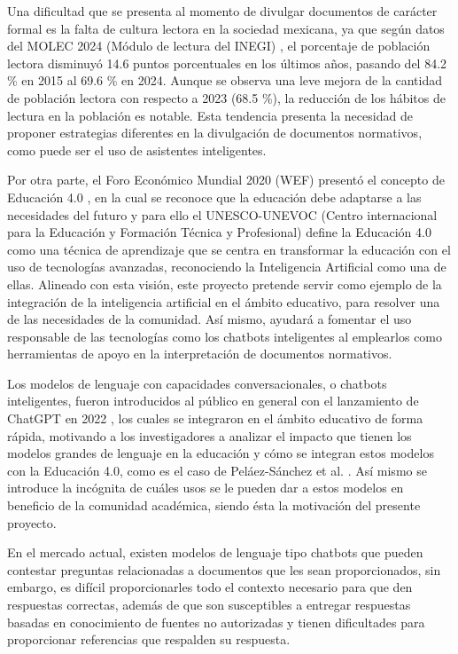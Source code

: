 Una dificultad que se presenta al momento de divulgar documentos de carácter
formal es la falta de cultura lectora en la sociedad mexicana, ya que según
datos del MOLEC 2024 (Módulo de lectura del INEGI) \cite{inegi_modulo_2024},
el porcentaje de población lectora disminuyó 14.6 puntos porcentuales en los últimos
años, pasando del 84.2 \% en 2015 al 69.6 \% en 2024. Aunque se observa
una leve mejora de la cantidad de población lectora con respecto a 2023 (68.5 \%),
la reducción de los hábitos de lectura en la población es notable. Esta tendencia
presenta la necesidad de proponer estrategias diferentes en la divulgación de documentos
normativos, como puede ser el uso de asistentes inteligentes.

Por otra parte, el Foro Económico Mundial 2020 (WEF) presentó el concepto de
Educación 4.0 \cite{world_economic_forum_schools_2020}, en la cual se reconoce que la
educación debe adaptarse a las necesidades del futuro y para ello el UNESCO-UNEVOC
(Centro internacional para la Educación y Formación Técnica y Profesional)
define la Educación 4.0 como una técnica de aprendizaje que se centra en
transformar la educación con el uso de tecnologías avanzadas, reconociendo la
Inteligencia Artificial como una de ellas. Alineado con esta visión, este proyecto
pretende servir como ejemplo de la integración de la inteligencia artificial en
el ámbito educativo, para resolver una de las necesidades de la comunidad. Así
mismo, ayudará a fomentar el uso responsable de las tecnologías como los chatbots
inteligentes al emplearlos como herramientas de apoyo en la interpretación de
documentos normativos.

Los modelos de lenguaje con capacidades conversacionales, o chatbots inteligentes,
fueron introducidos al público en general con el lanzamiento de ChatGPT en
2022 \cite{openai_introducing_2022}, los cuales se integraron en el ámbito educativo de
forma rápida, motivando a los investigadores a analizar el impacto que tienen los modelos
grandes de lenguaje en la educación y cómo se integran estos modelos con la
Educación 4.0, como es el caso de Peláez-Sánchez et al. \cite{pelaez-sanchez_impact_2024}.
Así mismo se introduce la incógnita de cuáles usos se le pueden dar a estos modelos en
beneficio de la comunidad académica, siendo ésta la motivación del presente proyecto.

En el mercado actual, existen modelos de lenguaje tipo chatbots que pueden
contestar preguntas relacionadas a documentos que les sean proporcionados,
sin embargo, es difícil proporcionarles todo el contexto necesario para que den
respuestas correctas, además de que son susceptibles a entregar respuestas basadas
en conocimiento de fuentes no autorizadas y tienen dificultades para proporcionar
referencias que respalden su respuesta.

